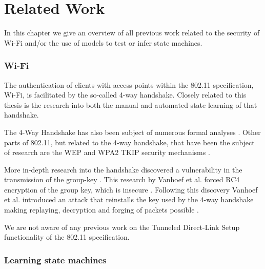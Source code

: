 \chapter{Related Work}\label{relatedwork}
\iffalse
In this chapter you demonstrate that you are sufficiently aware of the
state-of-art knowledge of the problem domain that you have investigated as
well as demonstrating that you have found a \emph{new} solution / approach / method.

TODO: Add paper by Joeri.
Bachelorthesises by Jules, Bart, Max
State machines in network and security protocols
Wi-Fi stuff
\fi

In this chapter we give an overview of all previous work related to the security of Wi-Fi and/or the use of models to test or infer state machines.

\subsection{Wi-Fi}

The authentication of clients with access points within the 802.11 specification, Wi-Fi, is facilitated by the so-called 4-way handshake. Closely related to this thesis is the research into both the manual \cite{Vanhoef:2017} and automated \cite{Stone:2018} state learning of that handshake.

The 4-Way Handshake has also been subject of numerous formal analyses \cite{He:2004,Dong:2009,Xing:2008,He:2005}. Other parts of 802.11, but related to the 4-way handshake, that have been the subject of research are the WEP and WPA2 TKIP security mechanisms \cite{Fluhrer:2001,Vanhoef:2013}.

More in-depth research into the handshake discovered a vulnerability in the transmission of the group-key \cite{Vanhoef:2016}. This research by Vanhoef et al. forced RC4 encryption of the group key, which is insecure \cite{Fluhrer:2001}. Following this discovery Vanhoef et al. introduced an attack that reinstalls the key used by the 4-way handshake making replaying, decryption and forging of packets possible \cite{Vanhoef:2017-2}.

We are not aware of any previous work on the Tunneled Direct-Link Setup functionality of the 802.11 specification.

\subsection{Learning state machines}

